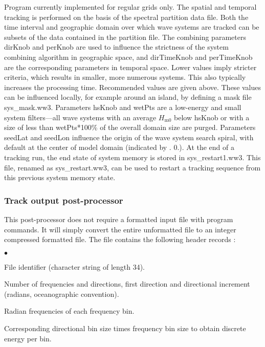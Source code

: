 \vspace{\baselineskip} 
\noindent 
Program currently implemented for regular grids only. The spatial and 
temporal tracking is performed on the basis of the spectral partition data 
file. Both the time interval and geographic domain over which wave systems 
are tracked can be subsets of the data contained in the partition file. The 
combining parameters {\file dirKnob} and {\file perKnob} are used to influence 
the strictness of the system combining algorithm in geographic space, and 
{\file dirTimeKnob} and {\file perTimeKnob} are the corresponding parameters 
in temporal space. Lower values imply stricter criteria, which results in 
smaller, more numerous systems. This also typically increases the processing 
time. Recommended values are given above. These values can be influenced 
locally, for example around an island, by defining a mask file {\file sys\_mask.ww3}. 
Parameters {\file hsKnob} and {\file wetPts} are a low-energy and small 
system filters---all wave systems with an average $H_\mathrm{m0}$ below 
{\file hsKnob} or with a size of less than {\file wetPts}*100\% of the 
overall domain size are purged. Parameters {\file seedLat} and {\file seedLon} 
influence the origin of the wave system search spiral, with default at the 
center of model domain (indicated by {. 0.}). At the end of a tracking 
run, the end state of system memory is stored in {\file sys\_restart1.ww3}. 
This file, renamed as {\file sys\_restart.ww3}, can be used to restart a 
tracking sequence from this previous system memory state.

\pb
\vsssub
\subsubsection{Track output post-processor} \label{sec:post_t}
\vsssub


\vspace{\baselineskip} 
\noindent
This post-processor does not require a formatted input file with program
commands. It will simply convert the entire unformatted file to an integer
compressed formatted file. The file contains the following header records :

\begin{list}{$\bullet$}{\itemsep 0mm \parsep 0mm}
\item File identifier (character string of length 34).
\item Number of frequencies and directions, first direction and directional
      increment (radians, oceanographic convention).
\item Radian frequencies of each frequency bin.
\item Corresponding directional bin size times frequency bin size to obtain
      discrete energy per bin.
\end{list}

